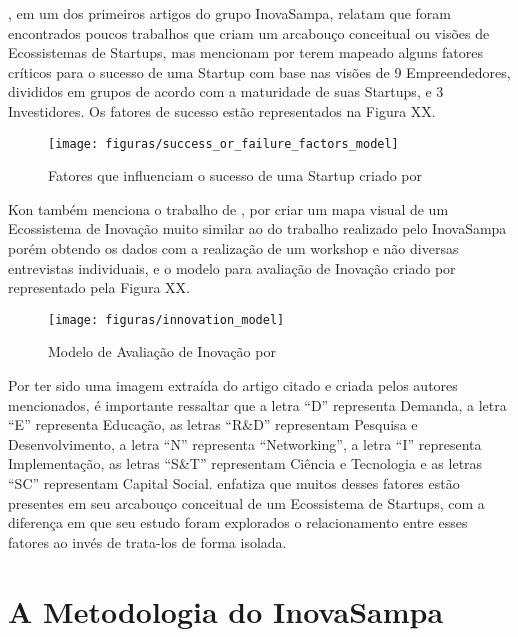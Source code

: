 , em um dos primeiros artigos do grupo InovaSampa, relatam que foram encontrados poucos trabalhos que criam um arcabouço conceitual ou visões de Ecossistemas de Startups, mas mencionam  por terem mapeado alguns fatores críticos para o sucesso de uma Startup com base nas visões de 9 Empreendedores, divididos em grupos de acordo com a maturidade de suas Startups, e 3 Investidores. Os fatores de sucesso estão representados na Figura XX.

\begin{figure}[!htb]
\centering
\texttt{[image: figuras/success\_or\_failure\_factors\_model]}
\caption{Fatores que influenciam o sucesso de uma Startup criado por }
\label{figure:success_or_failure_factors_model}
\end{figure}

Kon também menciona o trabalho de , por criar um mapa visual de um Ecossistema de Inovação muito similar ao do trabalho realizado pelo InovaSampa porém obtendo os dados com a realização de um workshop e não diversas entrevistas individuais, e o modelo para avaliação de Inovação criado por  representado pela Figura XX. 

\begin{figure}[!htb]
\centering
\texttt{[image: figuras/innovation\_model]}
\caption{Modelo de Avaliação de Inovação por }
\label{figure:innovation_model}
\end{figure}

Por ter sido uma imagem extraída do artigo citado e criada pelos autores mencionados, é importante ressaltar que a letra ``D'' representa Demanda, a letra ``E'' representa Educação, as letras ``R\&D'' representam Pesquisa e Desenvolvimento, a letra ``N'' representa ``Networking'', a letra ``I'' representa Implementação, as letras ``S\&T'' representam Ciência e Tecnologia e as letras ``SC'' representam Capital Social.  enfatiza que muitos desses fatores estão presentes em seu arcabouço conceitual de um Ecossistema de Startups, com a diferença em que seu estudo foram explorados o relacionamento entre esses fatores ao invés de trata-los de forma isolada.

\section{A Metodologia do InovaSampa}
\label{section:metodologia_do_inovasampa}

